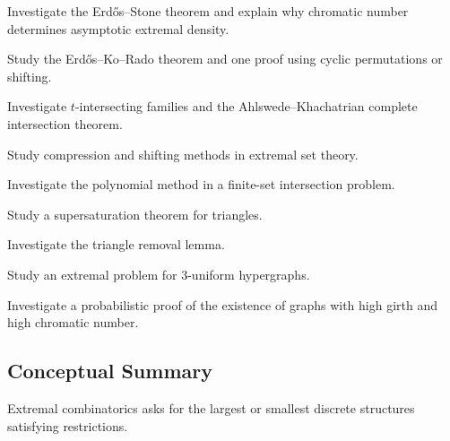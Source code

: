 \begin{exercise}[4]
Investigate the Erd\H{o}s--Stone theorem and explain why chromatic
number determines asymptotic extremal density.
\end{exercise}

\begin{exercise}[4]
Study the Erd\H{o}s--Ko--Rado theorem and one proof using cyclic
permutations or shifting.
\end{exercise}

\begin{exercise}[4]
Investigate \(t\)-intersecting families and the Ahlswede--Khachatrian
complete intersection theorem.
\end{exercise}

\begin{exercise}[4]
Study compression and shifting methods in extremal set theory.
\end{exercise}

\begin{exercise}[4]
Investigate the polynomial method in a finite-set intersection problem.
\end{exercise}

\begin{exercise}[4]
Study a supersaturation theorem for triangles.
\end{exercise}

\begin{exercise}[4]
Investigate the triangle removal lemma.
\end{exercise}

\begin{exercise}[4]
Study an extremal problem for \(3\)-uniform hypergraphs.
\end{exercise}

\begin{exercise}[4]
Investigate a probabilistic proof of the existence of graphs with high
girth and high chromatic number.
\end{exercise}

\subsection{Conceptual Summary}
\label{subsec:extremal-combinatorics-summary}

Extremal combinatorics asks for the largest or smallest discrete
structures satisfying restrictions.

